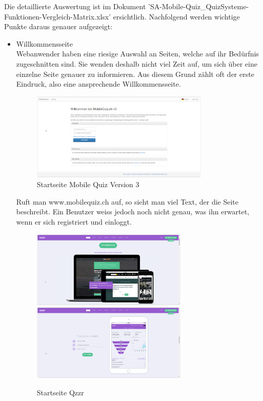 	Die detaillierte Auswertung ist im Dokument 'SA-Mobile-Quiz\_QuizSysteme-Funktionen-Vergleich-Matrix.xlsx' ersichtlich. Nachfolgend werden wichtige Punkte daraus genauer aufgezeigt:
	
	\begin{itemize}
		\item Willkommensseite \\
		Webanwender haben eine riesige Auswahl an Seiten, welche auf ihr Bedürfnis zugeschnitten sind. Sie wenden deshalb nicht viel Zeit auf, um sich über eine einzelne Seite genauer zu informieren. Aus diesem Grund zählt oft der erste Eindruck, also eine ansprechende Willkommensseite. \\
		
		\begin{figure}[H]
			\centering
			\includegraphics[width=0.8\textwidth]{Images/MobileQuiz_StartPage.PNG}
			\caption{Startseite Mobile Quiz Version 3}
		\end{figure}
		
		Ruft man www.mobilequiz.ch auf, so sieht man viel Text, der die Seite beschreibt. Ein Benutzer weiss jedoch noch nicht genau, was ihn erwartet, wenn er sich registriert und einloggt.
		
		\begin{figure}[H]
			\centering
			\includegraphics[width=0.7\textwidth]{Images/Qzzr_StartPage.PNG}
			\includegraphics[width=0.7\textwidth]
			{Images/Qzzr_StartPage_Statistics.PNG}
			\caption{Startseite Qzzr}
		\end{figure}
				

\end{itemize}
